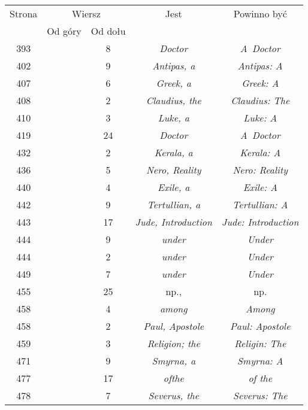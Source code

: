 \documentclass[a4paper,11pt]{article}
\begin{document}
\begin{center}
  \begin{tabular}{|c|c|c|c|c|}
    \hline
    Strona & \multicolumn{2}{c|}{Wiersz} & Jest
                              & Powinno być \\ \cline{2-3}
    & Od góry & Od dołu & & \\
    \hline
    393 & & \hphantom{0}8 & \textit{Doctor} & \textit{A~Doctor} \\
    402 & & \hphantom{0}9 & \textit{Antipas, a} & \textit{Antipas: A }\\
    407 & & \hphantom{0}6 & \textit{Greek, a} & \textit{Greek: A} \\
    408 & & \hphantom{0}2 & \textit{Claudius, the}
    & \textit{Claudius: The} \\
    410 & & \hphantom{0}3 & \textit{Luke, a} & \textit{Luke: A} \\
    419 & & 24 & \textit{Doctor} & \textit{A~Doctor} \\
    432 & & \hphantom{0}2 & \textit{Kerala, a} & \textit{Kerala: A} \\
    436 & & \hphantom{0}5 & \textit{Nero, Reality}
    & \textit{Nero: Reality} \\
    440 & & \hphantom{0}4 & \textit{Exile, a} & \textit{Exile: A} \\
    442 & & \hphantom{0}9 & \textit{Tertullian, a}
    & \textit{Tertullian: A} \\
    443 & & 17 & \textit{Jude, Introduction}
           & \textit{Jude: Introduction} \\
    444 & & \hphantom{0}9 & \textit{under} & \textit{Under} \\
    444 & & \hphantom{0}2 & \textit{under} & \textit{Under} \\
    449 & & \hphantom{0}7 & \textit{under} & \textit{Under} \\
    455 & & 25 & np., & np. \\
    458 & & \hphantom{0}4 & \textit{among} & \textit{Among} \\
    458 & & \hphantom{0}2 & \textit{Paul, Apostole}
    & \textit{Paul: Apostole} \\
    459 & & \hphantom{0}3 & \textit{Religion; the}
    & \textit{Religin: The} \\
    471 & & \hphantom{0}9 & \textit{Smyrna, a} & \textit{Smyrna: A} \\
    477 & & 17 & \textit{ofthe} & \textit{of the} \\
    478 & & \hphantom{0}7 & \textit{Severus, the} & \textit{Severus: The} \\

\end{tabular}
\end{center}
\end{document}

